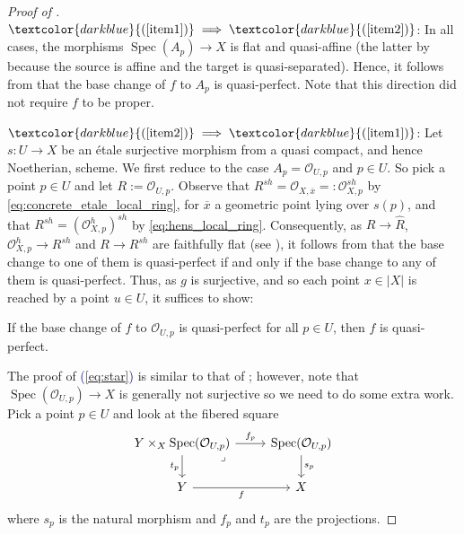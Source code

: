 \documentclass[11pt]{amsart}
\def\eqref#1{\textcolor{darkblue}{(\ref{#1})}}
\let\oldequation\equation
\let\oldendequation\endequation
\renewenvironment{equation}{\linenomathNonumbers\oldequation}{\oldendequation\endlinenomath}
\theoremstyle{plain}
\theoremstyle{definition}
\numberwithin{equation}{section}
\numberwithin{theorem}{section}
\begin{document}
\begin{proof}[Proof of ]
    $\eqref{item1}\implies\eqref{item2}$: 
    In all cases, the morphisms $\operatorname{Spec}(A_p)\to X$ is flat and quasi-affine (the latter by  because the source is affine and the target is quasi-separated). 
    Hence, it follows from  that the base change of $f$ to $A_p$ is quasi-perfect.
    Note that this direction did not require $f$ to be proper. 

    $\eqref{item2}\implies\eqref{item1}$:
    Let $s\colon U\to X$ be an \'{e}tale surjective morphism from a quasi compact, and hence Noetherian, scheme. 
    We first reduce to the case $A_p=\mathcal{O}_{U,p}$ and $p\in U$.
    So pick a point $p\in U$ and let $R:=\mathcal{O}_{U,p}$.
    Observe that $R^{sh}=\mathcal{O}_{X,\overline{x}}=:\mathcal{O}_{X,p}^{sh}$ by \cref{eq:concrete_etale_local_ring}, for $\overline{x}$ a geometric point lying over $s(p)$, and that $R^{sh}=(\mathcal{O}_{X,p}^{h})^{sh}$  by \cref{eq:hens_local_ring}.
    Consequently, as $R\to \widehat{R}$, $\mathcal{O}_{X,p}^{h}\to R^{sh}$ and $R\to R^{sh}$ are faithfully flat (see ), it follows from  that the base change to one of them is quasi-perfect if and only if the base change to any of them is quasi-perfect.
    Thus, as $g$ is surjective, and so each point $x\in |X|$ is reached by a point $u\in U$, it suffices to show:
    \begin{equation}\tag{$\star$}\label{eq:star}
        \begin{minipage}{10cm}
        {If the base change of $f$ to $\mathcal{O}_{U,p}$ is quasi-perfect for all $p \in U$, then $f$ is quasi-perfect.}
        \end{minipage}
    \end{equation}
    The proof of \eqref{eq:star} is similar to that of ; however, note that $\operatorname{Spec}(\mathcal{O}_{U,p})\to X$ is generally not surjective so we need to do some extra work.
    Pick a point $p\in U$ and look at the fibered square 
    \begin{displaymath}
        \begin{tikzcd}
            {Y\times_X \operatorname{Spec}(\mathcal{O}_{U,p})} & {\operatorname{Spec}(\mathcal{O}_{U,p})} \\
            Y & X
            \arrow["{f_p}", from=1-1, to=1-2]
            \arrow["{t_p}"', from=1-1, to=2-1]
            \arrow["{s_p}", from=1-2, to=2-2]
            \arrow["f"', from=2-1, to=2-2]
            \arrow["\lrcorner"{anchor=center, pos=0.125}, draw=none, from=1-1, to=2-2]
        \end{tikzcd}
    \end{displaymath}
    where $s_p$ is the natural morphism and $f_p$ and $t_p$ are the projections.


\end{proof}
\end{document}
